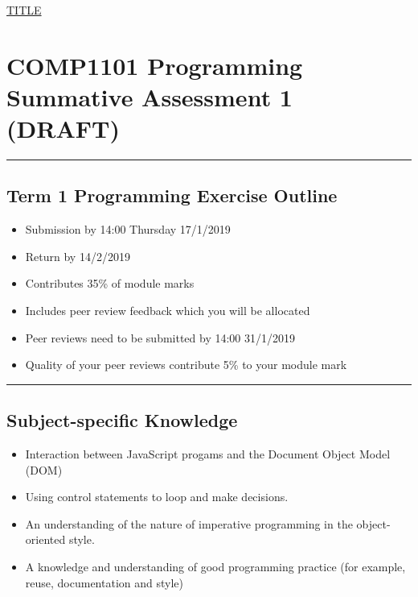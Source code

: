 \documentclass{article}[18pt]
\providecommand{\tightlist}{%
	\setlength{\itemsep}{0pt}\setlength{\parskip}{0pt}}
\begin{document}
\begin{center}
\underline{\huge TITLE}
\end{center}

\hypertarget{comp1101-programming-summative-assessment-1-draft}{%
	\section{COMP1101 Programming Summative Assessment 1
		(DRAFT)}\label{comp1101-programming-summative-assessment-1-draft}}

\begin{center}\rule{0.5\linewidth}{\linethickness}\end{center}

\hypertarget{term-1-programming-exercise-outline}{%
	\subsection{Term 1 Programming Exercise
		Outline}\label{term-1-programming-exercise-outline}}

\begin{itemize}
	\tightlist
	\item
	Submission by 14:00 Thursday 17/1/2019
	\item
	Return by 14/2/2019
	\item
	Contributes 35\% of module marks
	\item
	Includes peer review feedback which you will be allocated
	\item
	Peer reviews need to be submitted by 14:00 31/1/2019
	\item
	Quality of your peer reviews contribute 5\% to your module mark
\end{itemize}

\begin{center}\rule{0.5\linewidth}{\linethickness}\end{center}

\hypertarget{subject-specific-knowledge}{%
	\subsection{Subject-specific
		Knowledge}\label{subject-specific-knowledge}}

\begin{itemize}
	\tightlist
	\item
	Interaction between JavaScript progams and the Document Object Model
	(DOM)
	\item
	Using control statements to loop and make decisions.
	\item
	An understanding of the nature of imperative programming in the
	object-oriented style.
	\item
	A knowledge and understanding of good programming practice (for
	example, reuse, documentation and style)
\end{itemize}
\end{document}
